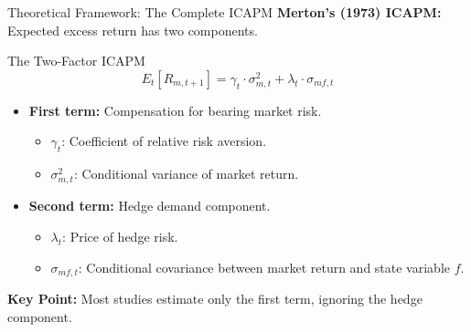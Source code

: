 \documentclass{beamer}
\begin{document}
\begin{frame}{Theoretical Framework: The Complete ICAPM}
    \textbf{Merton's (1973) ICAPM:} Expected excess return has two components.
    
    \begin{block}{The Two-Factor ICAPM}
        \begin{equation}
            E_t[R_{m,t+1}] = \gamma_t \cdot \sigma_{m,t}^2 + \lambda_t \cdot \sigma_{mf,t}
        \end{equation}
    \end{block}
    
    \begin{itemize}
        \item \textbf{First term:} Compensation for bearing market risk.
            \begin{itemize}
                \item $\gamma_t$: Coefficient of relative risk aversion.
                \item $\sigma_{m,t}^2$: Conditional variance of market return.
            \end{itemize}
        \item \textbf{Second term:} Hedge demand component.
            \begin{itemize}
                \item $\lambda_t$: Price of hedge risk.
                \item $\sigma_{mf,t}$: Conditional covariance between market return and state variable $f$.
            \end{itemize}
    \end{itemize}
    
    \textbf{Key Point:} Most studies estimate only the first term, ignoring the hedge component.
\end{frame}
\end{document}
